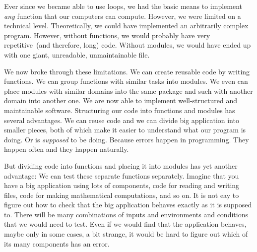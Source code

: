 Ever since we became able to use  loops, we had the basic means to implement \emph{any} function that our computers can compute.
However, we were limited on a technical level.
Theoretically, we could have implemented an arbitrarily complex program.
However, without functions, we would probably have very repetitive~(and therefore, long) code.
Without modules, we would have ended up with one giant, unreadable, unmaintainable file.

We now broke through these limitations.
We can create reusable code by writing functions.
We can group functions with similar tasks into modules.
We even can place modules with similar domains into the same package and such with another domain into another one.
We are now able to implement well-structured and maintainable software.%
%
\FloatBarrier%
\endhsection%
%
%
\label{sec:unitTesting}%
%
%
%
Structuring our code into functions and modules has several advantages.
We can reuse code and we can divide big application into smaller pieces, both of which make it easier to understand what our program is doing.
Or is \emph{supposed} to be doing.
Because errors happen in programming.
They happen often and they happen naturally.

But dividing code into functions and placing it into modules has yet another advantage:
We can test these separate functions separately.
Imagine that you have a big application using lots of components, code for reading and writing files, code for making mathematical computations, and so on.
It is not eay to figure out how to check that the big application behaves exactly as it is supposed to.
There will be many combinations of inputs and environments and conditions that we would need to test.
Even if we would find that the application behaves, maybe only in some cases, a bit strange, it would be hard to figure out which of its many components has an error.

